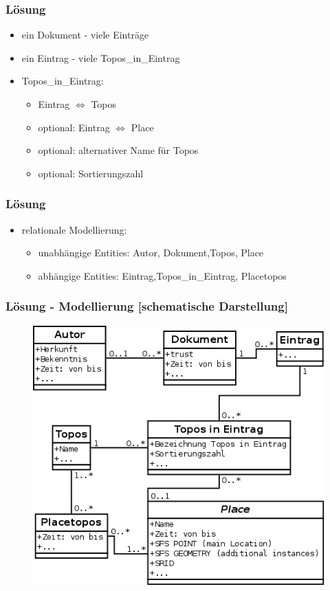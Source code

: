 \documentclass{beamer}
\begin{document}
	\begin{frame}
			\frametitle{Lösung}
			\begin{itemize}
				\item ein Dokument - viele Einträge
				\item ein Eintrag - viele Topos\_in\_Eintrag
				\item Topos\_in\_Eintrag: 
				\begin{itemize}
					\item Eintrag $\Leftrightarrow$ Topos 
					\item optional: Eintrag $\Leftrightarrow$ Place 
					\item optional: alternativer Name für Topos
					\item optional: Sortierungszahl
				\end{itemize}			 
			\end{itemize} 		
	\end{frame}

	\begin{frame}
			\frametitle{Lösung}
			\begin{itemize}
  					\item relationale Modellierung:
					\begin{itemize}
						\item unabhängige Entities: Autor, Dokument,Topos, Place
						\item abhängige Entities: Eintrag,Topos\_in\_Eintrag, Placetopos
					\end{itemize}
				\end{itemize} 
	\end{frame}
	
	\begin{frame}
			\frametitle{Lösung - Modellierung [schematische Darstellung]} 
				\begin{figure}
					\includegraphics[scale=0.3]{detail_2.png} 
				\end{figure}			
	\end{frame}
\end{document}
